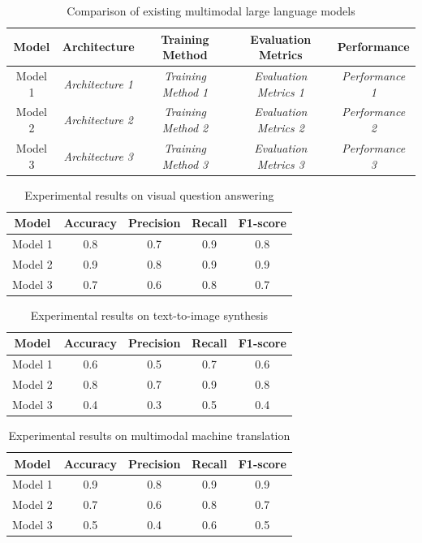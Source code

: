\documentclass{article}
\begin{document}
\begin{table}[h]
\centering
\caption{Comparison of existing multimodal large language models}
\begin{tabular}{|c|c|c|c|c|}
\hline
Model & Architecture & Training Method & Evaluation Metrics & Performance \\
\hline
Model 1 & \textit{Architecture 1} & \textit{Training Method 1} & \textit{Evaluation Metrics 1} & \textit{Performance 1} \\
\hline
Model 2 & \textit{Architecture 2} & \textit{Training Method 2} & \textit{Evaluation Metrics 2} & \textit{Performance 2} \\
\hline
Model 3 & \textit{Architecture 3} & \textit{Training Method 3} & \textit{Evaluation Metrics 3} & \textit{Performance 3} \\
\hline
\end{tabular}
\label{table:comparison}
\end{table}

\begin{table}[h]
\centering
\caption{Experimental results on visual question answering}
\begin{tabular}{|c|c|c|c|c|}
\hline
Model & Accuracy & Precision & Recall & F1-score \\
\hline
Model 1 & 0.8 & 0.7 & 0.9 & 0.8 \\
\hline
Model 2 & 0.9 & 0.8 & 0.9 & 0.9 \\
\hline
Model 3 & 0.7 & 0.6 & 0.8 & 0.7 \\
\hline
\end{tabular}
\label{table:visual_qa}
\end{table}

\begin{table}[h]
\centering
\caption{Experimental results on text-to-image synthesis}
\begin{tabular}{|c|c|c|c|c|}
\hline
Model & Accuracy & Precision & Recall & F1-score \\
\hline
Model 1 & 0.6 & 0.5 & 0.7 & 0.6 \\
\hline
Model 2 & 0.8 & 0.7 & 0.9 & 0.8 \\
\hline
Model 3 & 0.4 & 0.3 & 0.5 & 0.4 \\
\hline
\end{tabular}
\label{table:text_image}
\end{table}

\begin{table}[h]
\centering
\caption{Experimental results on multimodal machine translation}
\begin{tabular}{|c|c|c|c|c|}
\hline
Model & Accuracy & Precision & Recall & F1-score \\
\hline
Model 1 & 0.9 & 0.8 & 0.9 & 0.9 \\
\hline
Model 2 & 0.7 & 0.6 & 0.8 & 0.7 \\
\hline
Model 3 & 0.5 & 0.4 & 0.6 & 0.5 \\
\hline
\end{tabular}
\label{table:multimodal_mt}
\end{table}
\end{document}
